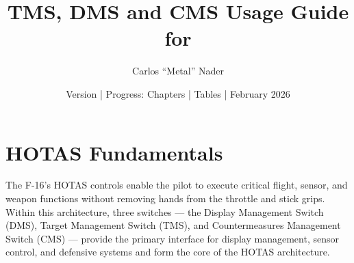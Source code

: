 \documentclass[11pt, a4paper, twoside]{report}
\title{TMS, DMS and CMS Usage Guide for \bmsver}
\author{Carlos ``Metal'' Nader}
\date{Version \fulldocversion{} | Progress: Chapters \chapterscompletedof{} | Tables \tablesfilledpct{} | February 2026}
\begin{document}
\maketitle


\setcounter{tocdepth}{3}       %
\setcounter{secnumdepth}{3}    %

\newpage

\tableofcontents

\newpage



%
%
%
 

\chapter{HOTAS Fundamentals}
\label{chap:C2}

The F-16's HOTAS controls enable the pilot to execute critical flight, sensor, and weapon functions without removing hands from the throttle and stick grips. Within this architecture, three switches — the Display Management Switch (DMS), Target Management Switch (TMS), and Countermeasures Management Switch (CMS) — provide the primary interface for display management, sensor control, and defensive systems and form the core of the HOTAS architecture.
\end{document}
